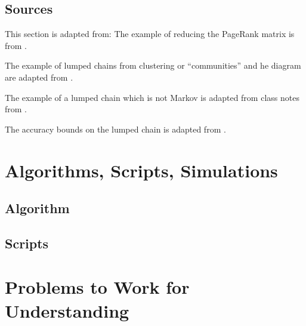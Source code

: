 \documentclass[12pt]{article}
\begin{document}
\subsection*{Sources} This section is adapted from:
The example of reducing the PageRank matrix is from
.

The example of lumped chains from clustering or ``communities'' and he
diagram are adapted from
.


The example of a lumped chain which is not Markov is adapted from
class notes from
.

The accuracy bounds on the lumped chain is adapted from
.


\nocite{}
\nocite{}

\hr

\section*{Algorithms, Scripts, Simulations}

\subsection*{Algorithm}

\subsection*{Scripts}


\hr

\section*{Problems to Work for Understanding}
\renewcommand{\theexerciseseries}{}
\renewcommand{\theexercise}{\arabic{exercise}}


\end{document}
